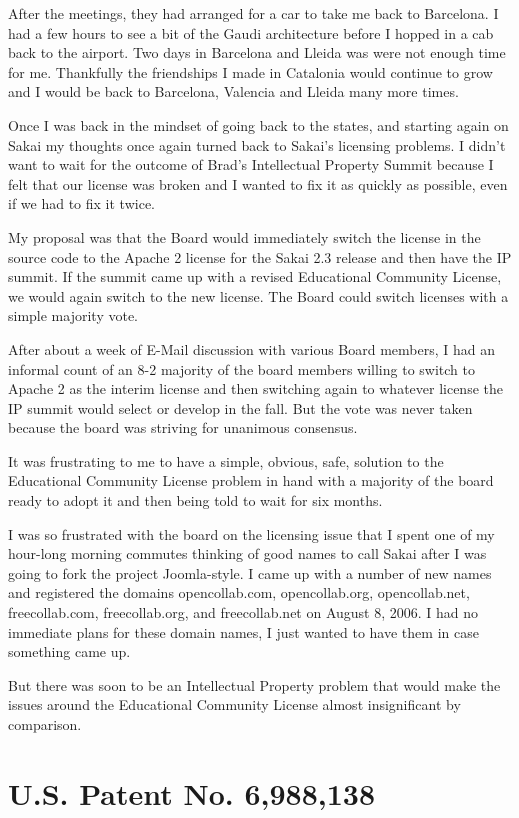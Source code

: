 \documentclass[12pt]{book}
\begin{document}
After the meetings, they had arranged for a car to take me back to Barcelona.
I had a few hours to see a bit
of the Gaudi architecture before I hopped in a cab back to the airport.
Two days in Barcelona and Lleida was were not enough time for me.  Thankfully
the friendships I made in Catalonia would continue to grow and
I would be back to Barcelona, Valencia and Lleida many more times.

Once I was back in the mindset of going back to the states, and starting
again on Sakai my thoughts once again turned back to Sakai's licensing
problems.  I didn't want to wait for the outcome of Brad's
Intellectual Property Summit because I felt that our license was broken
and I wanted to fix it as quickly as possible, even if we had to fix it
twice.

My proposal was that the Board would immediately switch the license in
the source code to the Apache 2 license for the Sakai 2.3 release and then
have the IP summit.  If the summit came up with a revised Educational
Community License, we would again switch to the new license.  The Board
could switch licenses with a simple majority vote.

After about a week of E-Mail discussion with various Board members, I
had an informal count of an 8-2 majority of the board members willing
to switch to Apache 2 as the interim license and then switching again
to whatever license the IP summit would select or develop in the fall.
But the vote was never taken because the board was striving for
unanimous consensus.

It was frustrating to me to have a simple, obvious, safe, solution
to the Educational Community License problem in hand with a majority
of the board ready to adopt it and then being told to wait for six months.

I was so frustrated with the board on the licensing issue that
I spent one of my hour-long morning commutes thinking of good names
to call Sakai after I was going to fork the project Joomla-style.
I came up with a number of new names and registered the domains
opencollab.com, opencollab.org, opencollab.net, freecollab.com,
freecollab.org, and freecollab.net on August 8, 2006.  I had no
immediate plans for these domain names, I just wanted to have
them in case something came up.

But there was soon to be an Intellectual Property problem that
would make the issues around the Educational Community License
almost insignificant by comparison.

\chapter{U.S. Patent No. 6,988,138}
\end{document}
